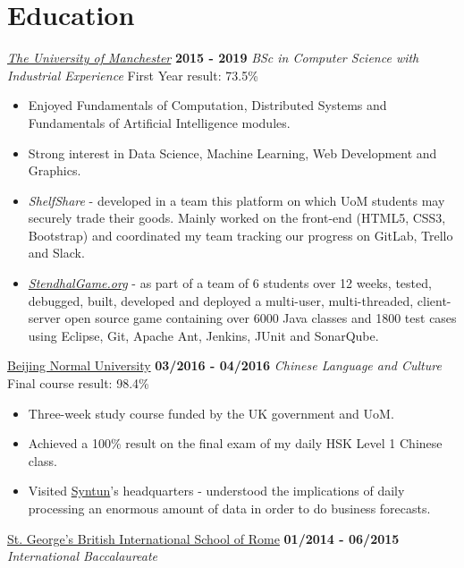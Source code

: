 \documentclass[]{friggeri-cv}
\begin{document}
\section{\color{red}Edu\color{gray}cation}
\begin{entrylist}
  \entry
    {}
    {\emph{\href{http://www.manchester.ac.uk/}{The University of Manchester}}}
    {\textbf{2015 - 2019}}
    {\emph{BSc in Computer Science with Industrial Experience}}
    {First Year result: 73.5\%}
    \begin{itemize}
        \item Enjoyed Fundamentals of Computation, Distributed Systems and Fundamentals of Artificial Intelligence modules.
        \item Strong interest in Data Science, Machine Learning, Web Development and Graphics.
        \item \emph{ShelfShare} - developed in a team this platform on which UoM students may securely trade their goods. Mainly worked on the front-end (HTML5, CSS3, Bootstrap) and coordinated my team tracking our progress on GitLab, Trello and Slack.
        \item \emph{\href{https://stendhalgame.org/}{StendhalGame.org}} - as part of a team of 6 students over 12 weeks, tested, debugged, built, developed and deployed a multi-user, multi-threaded, client-server open source game containing over 6000 Java classes and 1800 test cases using Eclipse, Git, Apache Ant, Jenkins, JUnit and SonarQube.\\
    \end{itemize}
  \entry
    {}
    {\href{http://english.bnu.edu.cn/}{Beijing Normal University}}
    {\textbf{03/2016 - 04/2016}}
    {\emph{Chinese Language and Culture}}
    {Final course result: 98.4\%}
    \begin{itemize}
        \item Three-week study course funded by the UK government and UoM.
        \item Achieved a 100\% result on the final exam of my daily HSK Level 1 Chinese class.
        \item Visited \href{http://www.syntun.com/}{Syntun}'s headquarters - understood the implications of daily processing an enormous amount of data in order to do business forecasts.\\
    \end{itemize}
  \entry
    {}
    {\href{http://www.stgeorge.school.it/}{St. George's British International School of Rome}}
    {\textbf{01/2014 - 06/2015}}
    {\emph{International Baccalaureate}}

\end{entrylist}
\end{document}
